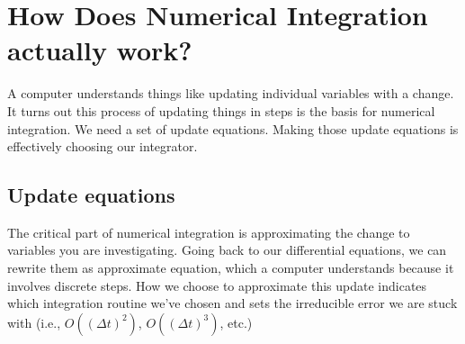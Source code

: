 \documentclass[letterpaper,10pt,english]{jupyterBook}
\begin{document}
\section{How Does Numerical Integration actually work?}
\label{\detokenize{content/1_mechanics/lagrange_2:how-does-numerical-integration-actually-work}}
\sphinxAtStartPar
A computer understands things like updating individual variables with a change. It turns out this process of updating things in steps is the basis for numerical integration. We need a set of update equations. Making those update equations is effectively choosing our integrator.


\subsection{Update equations}
\label{\detokenize{content/1_mechanics/lagrange_2:update-equations}}
\sphinxAtStartPar
The critical part of numerical integration is approximating the change to variables you are investigating. Going back to our differential equations, we can rewrite them as approximate equation, which a computer understands because it involves discrete steps. How we choose to approximate this update indicates which integration routine we’ve chosen and sets the irreducible error we are stuck with (i.e., \(O((\Delta t)^2)\), \(O((\Delta t)^3)\), etc.)
\end{document}
